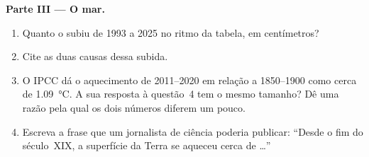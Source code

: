 \begin{problem}
\noindent\textbf{Parte III --- O mar.}\par\nopagebreak
\begin{enumerate}[resume, beginpenalty=10000]
  \item Quanto o  subiu de 1993 a 2025 no ritmo da tabela, em
        centímetros?
  \item Cite as duas causas dessa subida.
  \item O IPCC dá o aquecimento de 2011--2020 em relação a 1850--1900
        como cerca de \qty{1.09}{\degreeCelsius}. A sua resposta à
        questão~4 tem o mesmo tamanho? Dê uma razão pela qual os dois
        números diferem um pouco.
  \item Escreva a frase que um jornalista de ciência poderia publicar:
        ``Desde o fim do século~XIX, a superfície da Terra se aqueceu
        cerca de \ldots''
\end{enumerate}
\end{problem}
